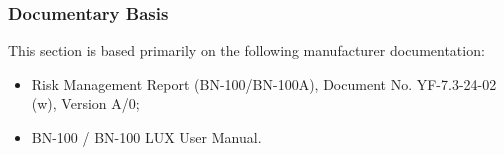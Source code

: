 
\subsubsection{Documentary Basis}

This section is based primarily on the following manufacturer
documentation:

\begin{itemize}
    \item Risk Management Report (BN-100/BN-100A),
    Document No. YF-7.3-24-02 (w), Version A/0;
    \item BN-100 / BN-100 LUX User Manual.
\end{itemize}

